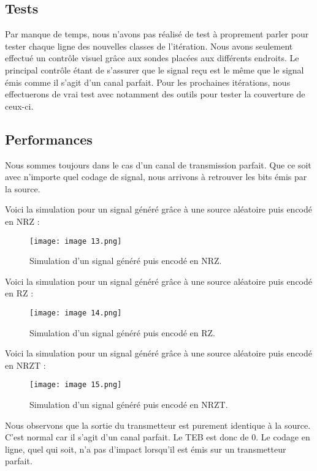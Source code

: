 \subsection{Tests}

Par manque de temps, nous n’avons pas réalisé de test à proprement parler pour tester chaque ligne des nouvelles classes de l’itération. Nous avons seulement effectué un contrôle visuel grâce aux sondes placées aux différents endroits. Le principal contrôle étant de s’assurer que le signal reçu est le même que le signal émis comme il s’agit d’un canal parfait.
Pour les prochaines itérations, nous effectuerons de vrai test avec notamment des outils pour tester la couverture de ceux-ci.

\subsection{Performances}

Nous sommes toujours dans le cas d’un canal de transmission parfait. Que ce soit avec n’importe quel codage de signal, nous arrivons à retrouver les bits émis par la source.

Voici la simulation pour un signal généré grâce à une source aléatoire puis encodé en NRZ :

\begin{figure}[h]
    \centering
    \texttt{[image: image 13.png]}
    \caption{\label{fig:image13}Simulation d'un signal généré puis encodé en NRZ.}
\end{figure}

Voici la simulation pour un signal généré grâce à une source aléatoire puis encodé en RZ :

\begin{figure}[h]
    \centering
    \texttt{[image: image 14.png]}
    \caption{\label{fig:image14}Simulation d'un signal généré puis encodé en RZ.}
\end{figure}

Voici la simulation pour un signal généré grâce à une source aléatoire puis encodé en NRZT :

\begin{figure}[h]
    \centering
    \texttt{[image: image 15.png]}
    \caption{\label{fig:image15}Simulation d'un signal généré puis encodé en NRZT.}
\end{figure}

Nous observons que la sortie du transmetteur est purement identique à la source. C’est normal car il s’agit d’un canal parfait. Le TEB est donc de 0. Le codage en ligne, quel qui soit, n’a pas d’impact
lorsqu’il est émis sur un transmetteur parfait.

